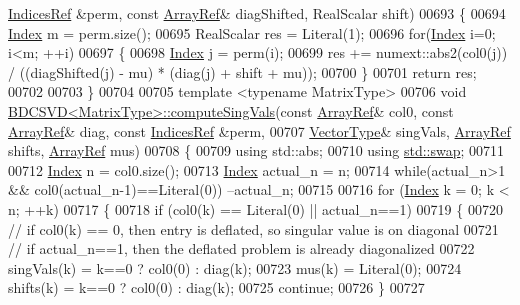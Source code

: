 \begin{DoxyCode}
      \hyperlink{group___core___module_class_eigen_1_1_ref}{IndicesRef} &perm, \textcolor{keyword}{const} \hyperlink{group___core___module_class_eigen_1_1_ref}{ArrayRef}& diagShifted, RealScalar shift)
00693 \{
00694   \hyperlink{namespace_eigen_a62e77e0933482dafde8fe197d9a2cfde}{Index} m = perm.size();
00695   RealScalar res = Literal(1);
00696   \textcolor{keywordflow}{for}(\hyperlink{namespace_eigen_a62e77e0933482dafde8fe197d9a2cfde}{Index} i=0; i<m; ++i)
00697   \{
00698     \hyperlink{namespace_eigen_a62e77e0933482dafde8fe197d9a2cfde}{Index} j = perm(i);
00699     res += numext::abs2(col0(j)) / ((diagShifted(j) - mu) * (diag(j) + shift + mu));
00700   \}
00701   \textcolor{keywordflow}{return} res;
00702 
00703 \}
00704 
00705 \textcolor{keyword}{template} <\textcolor{keyword}{typename} MatrixType>
00706 \textcolor{keywordtype}{void} \hyperlink{group___s_v_d___module_class_eigen_1_1_b_d_c_s_v_d}{BDCSVD<MatrixType>::computeSingVals}(\textcolor{keyword}{const} 
      \hyperlink{group___core___module_class_eigen_1_1_ref}{ArrayRef}& col0, \textcolor{keyword}{const} \hyperlink{group___core___module_class_eigen_1_1_ref}{ArrayRef}& diag, \textcolor{keyword}{const} \hyperlink{group___core___module_class_eigen_1_1_ref}{IndicesRef} &perm,
00707                                          \hyperlink{group___core___module}{VectorType}& singVals, 
      \hyperlink{group___core___module_class_eigen_1_1_ref}{ArrayRef} shifts, \hyperlink{group___core___module_class_eigen_1_1_ref}{ArrayRef} mus)
00708 \{
00709   \textcolor{keyword}{using} std::abs;
00710   \textcolor{keyword}{using} \hyperlink{endian_8c_a3ca5ecd34b04d6a243c054ac3a57f68d}{std::swap};
00711 
00712   \hyperlink{namespace_eigen_a62e77e0933482dafde8fe197d9a2cfde}{Index} n = col0.size();
00713   \hyperlink{namespace_eigen_a62e77e0933482dafde8fe197d9a2cfde}{Index} actual\_n = n;
00714   \textcolor{keywordflow}{while}(actual\_n>1 && col0(actual\_n-1)==Literal(0)) --actual\_n;
00715 
00716   \textcolor{keywordflow}{for} (\hyperlink{namespace_eigen_a62e77e0933482dafde8fe197d9a2cfde}{Index} k = 0; k < n; ++k)
00717   \{
00718     \textcolor{keywordflow}{if} (col0(k) == Literal(0) || actual\_n==1)
00719     \{
00720       \textcolor{comment}{// if col0(k) == 0, then entry is deflated, so singular value is on diagonal}
00721       \textcolor{comment}{// if actual\_n==1, then the deflated problem is already diagonalized}
00722       singVals(k) = k==0 ? col0(0) : diag(k);
00723       mus(k) = Literal(0);
00724       shifts(k) = k==0 ? col0(0) : diag(k);
00725       \textcolor{keywordflow}{continue};
00726     \} 
00727 

\end{DoxyCode}
